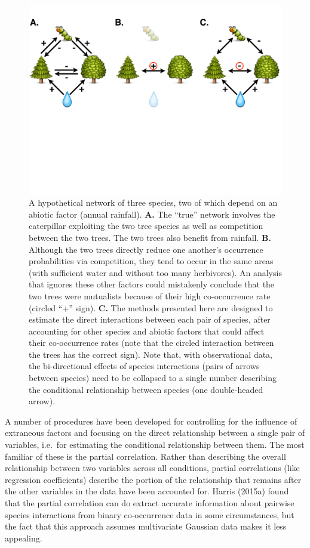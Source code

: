 \documentclass[12pt,]{article}
\begin{document}
\begin{spacing}{1.9}
\begin{flushleft}
\begin{figure}[htbp]
\centering
\includegraphics{figure-1.pdf}
\caption{A hypothetical network of three species, two of which depend on
an abiotic factor (annual rainfall). \textbf{A.} The ``true'' network
involves the caterpillar exploiting the two tree species as well as
competition between the two trees. The two trees also benefit from
rainfall. \textbf{B.} Although the two trees directly reduce one
another's occurrence probabilities via competition, they tend to occur
in the same areas (with sufficient water and without too many
herbivores). An analysis that ignores these other factors could
mistakenly conclude that the two trees were mutualists because of their
high co-occurrence rate (circled ``+'' sign). \textbf{C.} The methods
presented here are designed to estimate the direct interactions between
each pair of species, after accounting for other species and abiotic
factors that could affect their co-occurrence rates (note that the
circled interaction between the trees has the correct sign). Note that,
with observational data, the bi-directional effects of species
interactions (pairs of arrows between species) need to be collapsed to a
single number describing the conditional relationship between species
(one double-headed arrow).}
\end{figure}

A number of procedures have been developed for controlling for the
influence of extraneous factors and focusing on the direct relationship
between a single pair of variables, i.e.~for estimating the conditional
relationship between them. The most familiar of these is the partial
correlation. Rather than describing the overall relationship between two
variables across all conditions, partial correlations (like regression
coefficients) describe the portion of the relationship that remains
after the other variables in the data have been accounted for. Harris
(2015a) found that the partial correlation can do extract accurate
information about pairwise species interactions from binary
co-occurrence data in some circumstances, but the fact that this
approach assumes multivariate Gaussian data makes it less appealing.


\end{flushleft}
\end{spacing}
\end{document}
